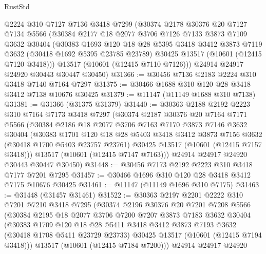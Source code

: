 \begin{lexlean}{RustStd}
\begin{coremodule}
    @2224
    @310
    @7127
    @7136
    @3418
    @7299
    (@30374
      @2178
      @30376
      @20
      @7127
      @7134
      @5566
      (@30384
        @2177
        @18
        @2077
        @3706
        @7126
        @7133
        @3873
        @7109
        @3632
        @30404
        (@30383
          @1693
          @120
          @18
          @28
          @5395
          @3418
          @3412
          @3873
          @7119
          @3632
          (@30418 @1692 @5395 @23785 @23789)
          @30425
          @13517
          (@10601 (@12415 @7120 @3418)))
        @13517
        (@10601 (@12415 @7110 @7126)))
      @24914
      @24917
      @24920
      @30443
      @30447
      @30450)
@31366 := @30456 @7136 @2183 @2224 @310 @3418 @7140 @7164 @7297
@31375 := @30466 @1688 @310 @120 @28 @3418 @3412 @7138 @10676 @30425
@31379 := @11147 (@11149 @1688 @310 @7138)
@31381 := @31366 (@31375 @31379)
@31440 := @30363
    @2188
    @2192
    @2223
    @310
    @7164
    @7173
    @3418
    @7297
    (@30374
      @2187
      @30376
      @20
      @7164
      @7171
      @5566
      (@30384
        @2186
        @18
        @2077
        @3706
        @7163
        @7170
        @3873
        @7146
        @3632
        @30404
        (@30383
          @1701
          @120
          @18
          @28
          @5403
          @3418
          @3412
          @3873
          @7156
          @3632
          (@30418 @1700 @5403 @23757 @23761)
          @30425
          @13517
          (@10601 (@12415 @7157 @3418)))
        @13517
        (@10601 (@12415 @7147 @7163)))
      @24914
      @24917
      @24920
      @30443
      @30447
      @30450)
@31448 := @30456 @7173 @2192 @2223 @310 @3418 @7177 @7201 @7295
@31457 := @30466 @1696 @310 @120 @28 @3418 @3412 @7175 @10676 @30425
@31461 := @11147 (@11149 @1696 @310 @7175)
@31463 := @31448 (@31457 @31461)
@31522 := @30363
    @2197
    @2201
    @2222
    @310
    @7201
    @7210
    @3418
    @7295
    (@30374
      @2196
      @30376
      @20
      @7201
      @7208
      @5566
      (@30384
        @2195
        @18
        @2077
        @3706
        @7200
        @7207
        @3873
        @7183
        @3632
        @30404
        (@30383
          @1709
          @120
          @18
          @28
          @5411
          @3418
          @3412
          @3873
          @7193
          @3632
          (@30418 @1708 @5411 @23729 @23733)
          @30425
          @13517
          (@10601 (@12415 @7194 @3418)))
        @13517
        (@10601 (@12415 @7184 @7200)))
      @24914
      @24917
      @24920

\end{coremodule}
\end{lexlean}
